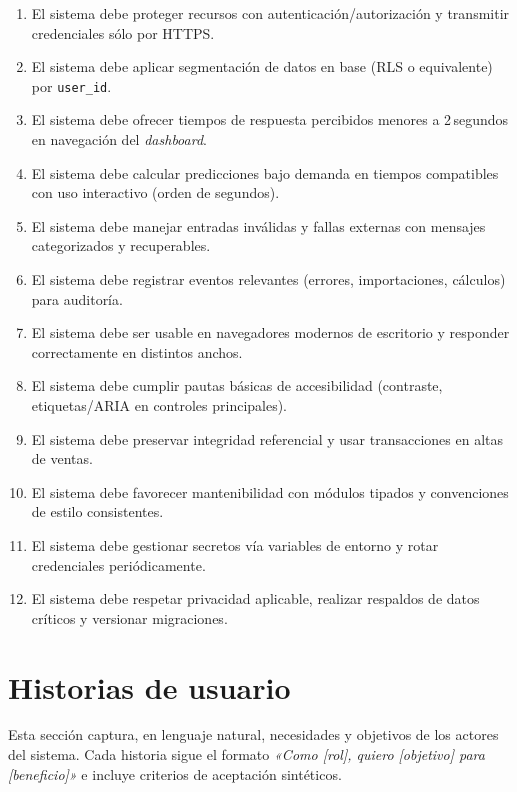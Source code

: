 \begin{enumerate}[label=RNF-\arabic*., leftmargin=*, nosep]
  \item El sistema debe proteger recursos con autenticación/autorización y transmitir credenciales sólo por HTTPS.
  \item El sistema debe aplicar segmentación de datos en base (RLS o equivalente) por \texttt{user\_id}.
  \item El sistema debe ofrecer tiempos de respuesta percibidos menores a 2\,segundos en navegación del \textit{dashboard}.
  \item El sistema debe calcular predicciones bajo demanda en tiempos compatibles con uso interactivo (orden de segundos).
  \item El sistema debe manejar entradas inválidas y fallas externas con mensajes categorizados y recuperables.
  \item El sistema debe registrar eventos relevantes (errores, importaciones, cálculos) para auditoría.
  \item El sistema debe ser usable en navegadores modernos de escritorio y responder correctamente en distintos anchos.
  \item El sistema debe cumplir pautas básicas de accesibilidad (contraste, etiquetas/ARIA en controles principales).
  \item El sistema debe preservar integridad referencial y usar transacciones en altas de ventas.
  \item El sistema debe favorecer mantenibilidad con módulos tipados y convenciones de estilo consistentes.
  \item El sistema debe gestionar secretos vía variables de entorno y rotar credenciales periódicamente.
  \item El sistema debe respetar privacidad aplicable, realizar respaldos de datos críticos y versionar migraciones.
\end{enumerate}

\vspace{1cm}
\section{Historias de usuario}
Esta sección captura, en lenguaje natural, necesidades y objetivos de los actores del sistema. Cada historia sigue el formato \emph{«Como [rol], quiero [objetivo] para [beneficio]»} e incluye criterios de aceptación sintéticos.

